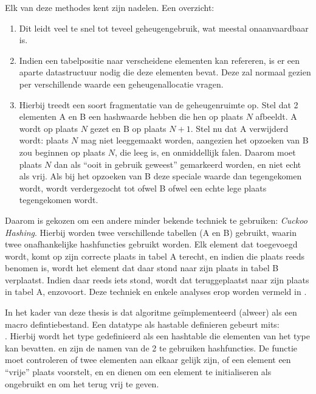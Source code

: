 Elk van deze methodes kent zijn nadelen. Een overzicht: \begin{enumerate}
\item Dit leidt veel te snel tot teveel geheugengebruik, wat meestal onaanvaardbaar is.
\item Indien een tabelpositie naar verscheidene elementen kan refereren, is er een aparte datastructuur nodig die deze elementen bevat. Deze zal normaal gezien per verschillende waarde een geheugenallocatie vragen. 
\item Hierbij treedt een soort fragmentatie van de geheugenruimte op. Stel dat 2 elementen A en B een hashwaarde hebben die hen op plaats $N$ afbeeldt. A wordt op plaats $N$ gezet en B op plaats $N+1$. Stel nu dat A verwijderd wordt: plaats $N$ mag niet leeggemaakt worden, aangezien het opzoeken van B zou beginnen op plaats $N$, die leeg is, en onmiddellijk falen. Daarom moet plaats $N$ dan als ``ooit in gebruik geweest'' gemarkeerd worden, en niet echt als vrij. Als bij het opzoeken van B deze speciale waarde dan tegengekomen wordt, wordt verdergezocht tot ofwel B ofwel een echte lege plaats tegengekomen wordt.
\end{enumerate}

Daarom is gekozen om een andere minder bekende techniek te gebruiken: {\em Cuckoo Hashing}. Hierbij worden twee verschillende tabellen (A en B) gebruikt, waarin twee onafhankelijke hashfuncties gebruikt worden. Elk element dat toegevoegd wordt, komt op zijn correcte plaats in tabel A terecht, en indien die plaats reeds benomen is, wordt het element dat daar stond naar zijn plaats in tabel B verplaatst. Indien daar reeds iets stond, wordt dat teruggeplaatst naar zijn plaats in tabel A, enzovoort. Deze techniek en enkele analyses erop worden vermeld in \cite{cuckoo}.

In het kader van deze thesis is dat algoritme ge\"implementeerd (alweer) als een macro defintiebestand. Een datatype als hastable definieren gebeurt mits: \\
. Hierbij wordt het type  gedefinieerd als een hashtable die elementen van het type  kan bevatten.  en  zijn de namen van de 2 te gebruiken hashfuncties. De functie  moet controleren of twee elementen aan elkaar gelijk zijn,  of een element een ``vrije'' plaats voorstelt, en  en  dienen om een element te initialiseren als ongebruikt en om het terug vrij te geven.

